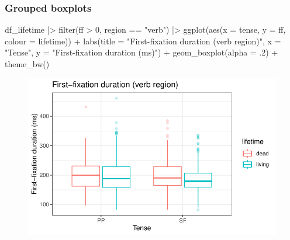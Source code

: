 \documentclass[
  letterpaper,
  DIV=11,
  numbers=noendperiod]{scrartcl}
\newenvironment{Shaded}{\begin{snugshade}}{\end{snugshade}}
\newcommand{\AttributeTok}[1]{\textcolor[rgb]{0.40,0.45,0.13}{#1}}
\newcommand{\DecValTok}[1]{\textcolor[rgb]{0.68,0.00,0.00}{#1}}
\newcommand{\FunctionTok}[1]{\textcolor[rgb]{0.28,0.35,0.67}{#1}}
\newcommand{\NormalTok}[1]{\textcolor[rgb]{0.00,0.23,0.31}{#1}}
\newcommand{\SpecialCharTok}[1]{\textcolor[rgb]{0.37,0.37,0.37}{#1}}
\newcommand{\StringTok}[1]{\textcolor[rgb]{0.13,0.47,0.30}{#1}}
\begin{document}
\hypertarget{grouped-boxplots}{%
\subsubsection{Grouped boxplots}\label{grouped-boxplots}}

\begin{Shaded}
\begin{Highlighting}[numbers=left,,]
\NormalTok{df\_lifetime }\SpecialCharTok{|\textgreater{}}
  \FunctionTok{filter}\NormalTok{(ff }\SpecialCharTok{\textgreater{}} \DecValTok{0}\NormalTok{,}
\NormalTok{         region }\SpecialCharTok{==} \StringTok{"verb"}\NormalTok{) }\SpecialCharTok{|\textgreater{}}
  \FunctionTok{ggplot}\NormalTok{(}\FunctionTok{aes}\NormalTok{(}\AttributeTok{x =}\NormalTok{ tense, }\AttributeTok{y =}\NormalTok{ ff, }\AttributeTok{colour =}\NormalTok{ lifetime)) }\SpecialCharTok{+}
  \FunctionTok{labs}\NormalTok{(}\AttributeTok{title =} \StringTok{"First{-}fixation duration (verb region)"}\NormalTok{,}
       \AttributeTok{x =} \StringTok{"Tense"}\NormalTok{,}
       \AttributeTok{y =} \StringTok{"First{-}fixation duration (ms)"}\NormalTok{) }\SpecialCharTok{+}
  \FunctionTok{geom\_boxplot}\NormalTok{(}\AttributeTok{alpha =}\NormalTok{ .}\DecValTok{2}\NormalTok{) }\SpecialCharTok{+}
  \FunctionTok{theme\_bw}\NormalTok{()}
\end{Highlighting}
\end{Shaded}

\begin{figure}[H]

{\centering \includegraphics{_data_viz_files/figure-pdf/unnamed-chunk-31-1.pdf}

}

\end{figure}
\end{document}
